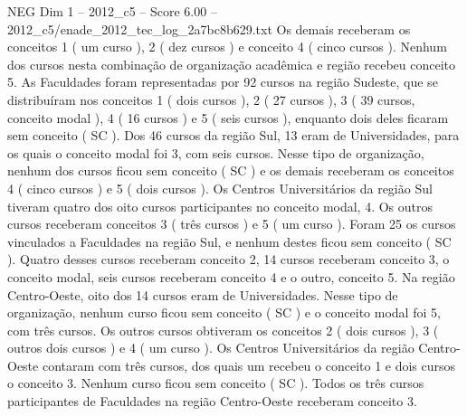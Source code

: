 \begin{textsample}{NEG Dim 1 – 2012\_c5 – Score 6.00 – 2012\_c5/enade\_2012\_tec\_log\_2a7bc8b629.txt}
Os demais receberam os conceitos 1 ( um curso ), 2 ( dez cursos ) e conceito 4 ( cinco cursos ).
Nenhum dos cursos nesta combinação de organização acadêmica e região recebeu conceito 5.
As Faculdades foram representadas por 92 cursos na região Sudeste, que se distribuíram nos conceitos 1 ( dois cursos ), 2 ( 27 cursos ), 3 ( 39 cursos, conceito modal ), 4 ( 16 cursos ) e 5 ( seis cursos ), enquanto dois deles ficaram sem conceito ( SC ).
Dos 46 cursos da região Sul, 13 eram de Universidades, para os quais o conceito modal foi 3, com seis cursos.
Nesse tipo de organização, nenhum dos cursos ficou sem conceito ( SC ) e os demais receberam os conceitos 4 ( cinco cursos ) e 5 ( dois cursos ).
Os Centros Universitários da região Sul tiveram quatro dos oito cursos participantes no conceito modal, 4.
Os outros cursos receberam conceitos 3 ( três cursos ) e 5 ( um curso ).
Foram 25 os cursos vinculados a Faculdades na região Sul, e nenhum destes ficou sem conceito ( SC ).
Quatro desses cursos receberam conceito 2, 14 cursos receberam conceito 3, o conceito modal, seis cursos receberam conceito 4 e o outro, conceito 5.
Na região Centro-Oeste, oito dos 14 cursos eram de Universidades.
Nesse tipo de organização, nenhum curso ficou sem conceito ( SC ) e o conceito modal foi 5, com três cursos.
Os outros cursos obtiveram os conceitos 2 ( dois cursos ), 3 ( outros dois cursos ) e 4 ( um curso ).
Os Centros Universitários da região Centro-Oeste contaram com três cursos, dos quais um recebeu o conceito 1 e dois cursos o conceito 3.
Nenhum curso ficou sem conceito ( SC ).
Todos os três cursos participantes de Faculdades na região Centro-Oeste receberam conceito 3.

\end{textsample}

